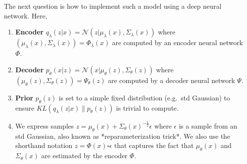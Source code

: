 




The next question is how to implement such a model using a deep neural network. Here,

\begin{enumerate}
  \item \textbf{Encoder} $q_{\lambda}(z|x) = \mathcal{N}(z | \mu_{\lambda}(x), \Sigma_{\lambda}(x))$ where $(\mu_{\lambda}(x),\Sigma_{\lambda}(x)) = \Phi_{\lambda}(x)$ are computed by an encoder neural network $\Phi$.
  \item \textbf{Decoder} $p_{\theta}(x|z) = \mathcal{N}(x | \mu_{\theta}(z), \Sigma_{\theta}(z))$ where $(\mu_{\theta}(z),\Sigma_{\theta}(z)) = \Psi_{\theta}(z)$ are computed by a decoder neural network $\Psi$.
  \item \textbf{Prior} $p_{\theta}(z)$ is set to a simple fixed distribution (e.g.~std Gaussian) to ensure $KL(q_{\lambda}(z|x) \| p_{\theta}(z))$ is trivial to compute.
  \item We express samples $z = \mu_{\theta}(x) + \Sigma_{\theta}(x)^{-\frac{1}{2}} \epsilon$ where $\epsilon$ is a sample from an std Gaussian, also known as *reparameterization trick*. We also use the shorthand notation $z = \Phi(x) \square \epsilon$ that captures the fact that $\mu_{\theta}(x)$ and $\Sigma_{\theta}(x)$ are estimated by the encoder $\Phi$.
  \end{enumerate}




